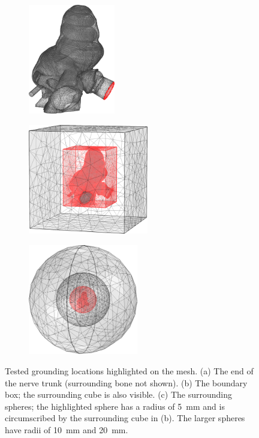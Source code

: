 \begin{figure}
    \centering
    
    \begin{subfigure}[t]{0.28\textwidth}
        \centering
        \includegraphics[height=4.8cm]{Simulations/BCs/mesh_nrv}
        \caption{}
        \label{fig:bc_mesh_nrv}
    \end{subfigure}%
    \hfill%
    \begin{subfigure}[t]{0.37\textwidth}
        \centering
        \includegraphics[height=4.8cm]{Simulations/BCs/mesh_box}
        \caption{}
        \label{fig:bc_mesh_box}
    \end{subfigure}%
    \hfill%
    \begin{subfigure}[t]{0.35\textwidth}
        \centering
        \includegraphics[height=4.8cm]{Simulations/BCs/mesh_sph}
        \caption{}
        \label{fig:bc_mesh_sph}
    \end{subfigure}%
    
	\caption[Tested grounding locations]{Tested grounding locations highlighted on
	the mesh. (a) The end of the nerve trunk (surrounding bone not shown). (b) The
	boundary box; the surrounding cube is also visible. (c) The surrounding
	spheres; the highlighted sphere has a radius of 5~mm and is circumscribed by
	the surrounding cube in (b). The larger spheres have radii of 10~mm and 20~mm.}
	\label{fig:bc_meshes}
\end{figure}

